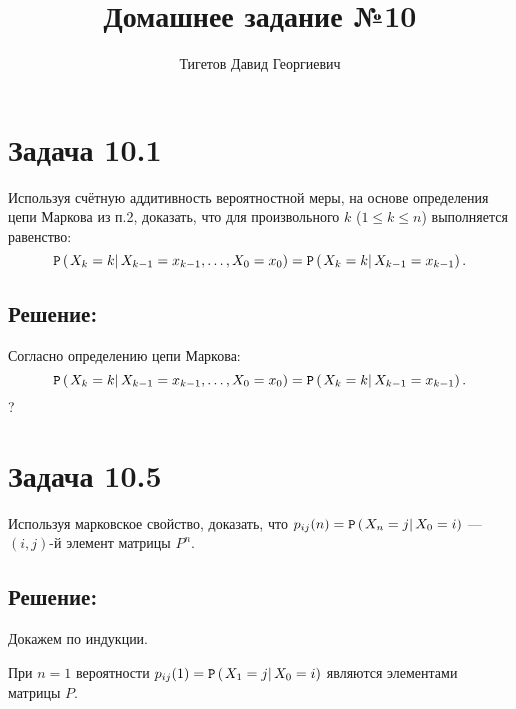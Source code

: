 \documentclass[12pt]{article}
\begin{document}
    \title{Домашнее задание №10}
    \author{Тигетов Давид Георгиевич}
    \date{}
    \maketitle

    \section*{Задача 10.1}
    Используя счётную аддитивность вероятностной меры, на основе определения цепи Маркова из п.2, доказать, что для произвольного $k$ ($1 \le k \le n$) выполняется равенство:
    \[
        \mathtt{P} \left ( \left . {X_k = k} \right | {X_{k-1} = x_{k-1}, \dots, X_0 = x_0} \right ) = \mathtt{P} \left ( \left . {X_k = k} \right | {X_{k-1} = x_{k-1}} \right ).
    \]

    \subsection*{Решение:}
    Согласно определению цепи Маркова:
    \[
        \mathtt{P} \left ( \left . {X_k = k} \right | {X_{k-1} = x_{k-1}, \dots, X_0 = x_0} \right ) = \mathtt{P} \left ( \left . {X_k = k} \right | {X_{k-1} = x_{k-1}} \right ).
    \]
    ?

    \section*{Задача 10.5}
    Используя марковское свойство, доказать, что $p_{ij}(n) = \mathtt{P} \left ( \left . {X_n = j} \right | {X_0 = i} \right )$ --- $(i,j)$-й элемент матрицы $P^n$.

    \subsection*{Решение:}
    Докажем по индукции.

    При $n=1$ вероятности $p_{ij}(1) = \mathtt{P} \left ( \left . {X_1 = j} \right | {X_0 = i} \right )$ являются элементами матрицы $P$.
\end{document}
